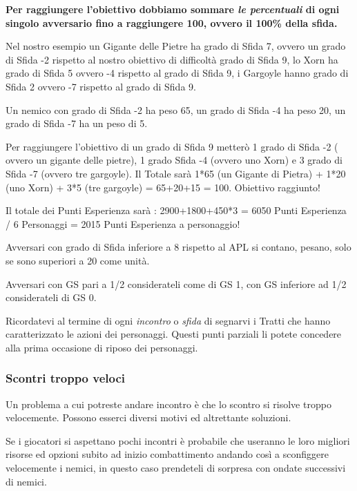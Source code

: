 \begin{multicols}{2}
\textbf{Per raggiungere l'obiettivo dobbiamo sommare \emph{le percentuali} di ogni singolo avversario fino a raggiungere 100, ovvero il 100\% della sfida.}

Nel nostro esempio un Gigante delle Pietre ha grado di Sfida 7, ovvero un grado di Sfida -2 rispetto al nostro obiettivo di difficoltà grado di Sfida 9, lo Xorn ha grado di Sfida 5 ovvero -4 rispetto al grado di Sfida 9, i Gargoyle hanno grado di Sfida 2 ovvero -7 rispetto al grado di Sfida 9.

Un nemico con grado di Sfida -2 ha peso 65, un grado di Sfida -4 ha peso 20, un grado di Sfida -7 ha un peso di 5.

Per raggiungere l'obiettivo di un grado di Sfida 9 metterò 1 grado di Sfida -2 ( ovvero un gigante delle pietre), 1 grado Sfida -4 (ovvero uno Xorn) e 3 grado di Sfida -7 (ovvero tre gargoyle). Il Totale sarà 1*65 (un Gigante di Pietra) + 1*20 (uno Xorn) + 3*5 (tre gargoyle) = 65+20+15 = 100. Obiettivo raggiunto!

Il totale dei Punti Esperienza sarà : 2900+1800+450*3 = 6050 Punti Esperienza / 6 Personaggi = 2015 Punti Esperienza a personaggio!

Avversari con grado di Sfida inferiore a 8 rispetto al APL si contano, pesano, solo se sono superiori a 20 come unità.

Avversari con GS pari a 1/2 considerateli come di GS 1, con GS inferiore ad 1/2 considerateli di GS 0.

\begin{changemargin}{0.3cm}{0.3cm}\begin{narratore}
Ricordatevi al termine di ogni \emph{incontro} o \emph{sfida} di segnarvi i Tratti che hanno caratterizzato le azioni dei personaggi. Questi punti parziali li potete concedere alla prima occasione di riposo dei personaggi.
\end{narratore}\end{changemargin}

\subsubsection{Scontri troppo veloci}

Un problema a cui potreste andare incontro è che lo scontro si risolve troppo velocemente. Possono esserci diversi motivi ed altrettante soluzioni.

Se i giocatori si aspettano pochi incontri è probabile che useranno le loro migliori risorse ed opzioni subito ad inizio combattimento andando così a sconfiggere velocemente i nemici, in questo caso prendeteli di sorpresa con ondate successivi di nemici.


\end{multicols}
